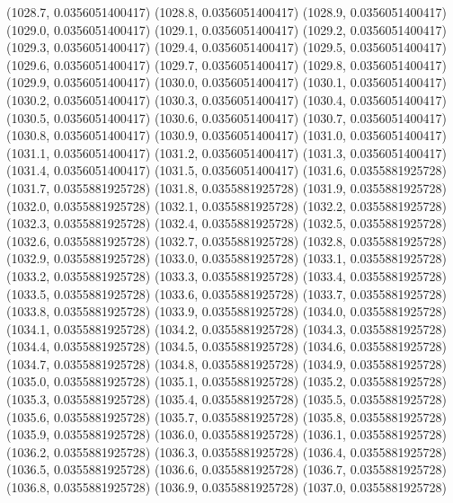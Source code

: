 {					(1028.7, 0.0356051400417)
					(1028.8, 0.0356051400417)
					(1028.9, 0.0356051400417)
					(1029.0, 0.0356051400417)
					(1029.1, 0.0356051400417)
					(1029.2, 0.0356051400417)
					(1029.3, 0.0356051400417)
					(1029.4, 0.0356051400417)
					(1029.5, 0.0356051400417)
					(1029.6, 0.0356051400417)
					(1029.7, 0.0356051400417)
					(1029.8, 0.0356051400417)
					(1029.9, 0.0356051400417)
					(1030.0, 0.0356051400417)
					(1030.1, 0.0356051400417)
					(1030.2, 0.0356051400417)
					(1030.3, 0.0356051400417)
					(1030.4, 0.0356051400417)
					(1030.5, 0.0356051400417)
					(1030.6, 0.0356051400417)
					(1030.7, 0.0356051400417)
					(1030.8, 0.0356051400417)
					(1030.9, 0.0356051400417)
					(1031.0, 0.0356051400417)
					(1031.1, 0.0356051400417)
					(1031.2, 0.0356051400417)
					(1031.3, 0.0356051400417)
					(1031.4, 0.0356051400417)
					(1031.5, 0.0356051400417)
					(1031.6, 0.0355881925728)
					(1031.7, 0.0355881925728)
					(1031.8, 0.0355881925728)
					(1031.9, 0.0355881925728)
					(1032.0, 0.0355881925728)
					(1032.1, 0.0355881925728)
					(1032.2, 0.0355881925728)
					(1032.3, 0.0355881925728)
					(1032.4, 0.0355881925728)
					(1032.5, 0.0355881925728)
					(1032.6, 0.0355881925728)
					(1032.7, 0.0355881925728)
					(1032.8, 0.0355881925728)
					(1032.9, 0.0355881925728)
					(1033.0, 0.0355881925728)
					(1033.1, 0.0355881925728)
					(1033.2, 0.0355881925728)
					(1033.3, 0.0355881925728)
					(1033.4, 0.0355881925728)
					(1033.5, 0.0355881925728)
					(1033.6, 0.0355881925728)
					(1033.7, 0.0355881925728)
					(1033.8, 0.0355881925728)
					(1033.9, 0.0355881925728)
					(1034.0, 0.0355881925728)
					(1034.1, 0.0355881925728)
					(1034.2, 0.0355881925728)
					(1034.3, 0.0355881925728)
					(1034.4, 0.0355881925728)
					(1034.5, 0.0355881925728)
					(1034.6, 0.0355881925728)
					(1034.7, 0.0355881925728)
					(1034.8, 0.0355881925728)
					(1034.9, 0.0355881925728)
					(1035.0, 0.0355881925728)
					(1035.1, 0.0355881925728)
					(1035.2, 0.0355881925728)
					(1035.3, 0.0355881925728)
					(1035.4, 0.0355881925728)
					(1035.5, 0.0355881925728)
					(1035.6, 0.0355881925728)
					(1035.7, 0.0355881925728)
					(1035.8, 0.0355881925728)
					(1035.9, 0.0355881925728)
					(1036.0, 0.0355881925728)
					(1036.1, 0.0355881925728)
					(1036.2, 0.0355881925728)
					(1036.3, 0.0355881925728)
					(1036.4, 0.0355881925728)
					(1036.5, 0.0355881925728)
					(1036.6, 0.0355881925728)
					(1036.7, 0.0355881925728)
					(1036.8, 0.0355881925728)
					(1036.9, 0.0355881925728)
					(1037.0, 0.0355881925728)
}
